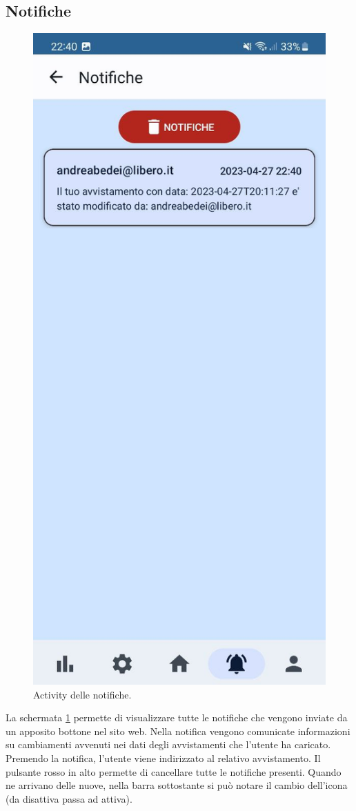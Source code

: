 \documentclass[a4paper,final,12pt]{report}
\begin{document}
\subsection{Notifiche}
\begin{figure}[hbtp]
\centering
\includegraphics[scale=0.20]{img_concettuale/notmob.jpg}
\caption{Activity delle notifiche.}
\label{figura:actnotifiche}
\end{figure}
La schermata \ref{figura:actnotifiche} permette di visualizzare tutte le notifiche che vengono inviate da un apposito bottone nel sito web. Nella notifica vengono comunicate informazioni su cambiamenti avvenuti nei dati degli avvistamenti che l'utente ha caricato. Premendo la notifica, l'utente viene indirizzato al relativo avvistamento. Il pulsante rosso in alto permette di cancellare tutte le notifiche presenti. Quando ne arrivano delle nuove, nella barra sottostante si può notare il cambio dell'icona (da disattiva passa ad attiva).
\end{document}
